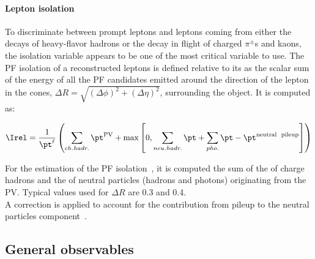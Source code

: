 \paragraph{Lepton isolation}\label{sec:c2iso}
To discriminate between prompt leptons and leptons coming from either the decays
of heavy-flavor hadrons or the decay in flight of charged $\pi^{\pm}$s and kaons, the isolation variable appears to be one of
the most critical variable to use. The PF isolation of a reconstructed
leptons is defined relative to its \pt as the scalar
sum of the energy of all the PF candidates emitted around the
direction of the lepton in the cones, $\Delta R = \sqrt{(\Delta
  \phi)^2+(\Delta \eta)^2}$, surrounding the object. It is computed as:
\begin{linenomath}
  \begin{equation}
    \label{eq:c2irel}
    \Irel = \frac{1}{\pt^\ell}
    \left(\sum_{ch.hadr.}\pt^{\mathrm{PV}} +
    \max{\left[0, \sum_{neu.hadr.}\pt + \sum_{pho.}\pt
        - \pt^{\text{neutral \ pileup}}\right]}\right)
  \end{equation}
\end{linenomath}
For the estimation of the PF isolation~\cite{CMS:particleflow}, it is computed the sum of the
\pt of charge hadrons and the \pt of neutral particles (hadrons
and photons) originating from the PV. Typical values used for  $\Delta
R$ are 0.3 and 0.4.\\
A correction is applied to account for the contribution from pileup to the
neutral particles component~\cite{Sirunyan_2018_muon}.

\subsection*{General observables} \label{sec:c2observables}
